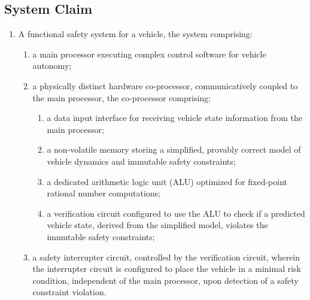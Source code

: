 \documentclass{article}
\begin{document}
\subsection*{System Claim}
\begin{enumerate}
    \item A functional safety system for a vehicle, the system comprising:
    \begin{enumerate}
        \item a main processor executing complex control software for vehicle autonomy;
        \item a physically distinct hardware co-processor, communicatively coupled to the main processor, the co-processor comprising:
        \begin{enumerate}
            \item a data input interface for receiving vehicle state information from the main processor;
            \item a non-volatile memory storing a simplified, provably correct model of vehicle dynamics and immutable safety constraints;
            \item a dedicated arithmetic logic unit (ALU) optimized for fixed-point rational number computations;
            \item a verification circuit configured to use the ALU to check if a predicted vehicle state, derived from the simplified model, violates the immutable safety constraints;
        \end{enumerate}
        \item a safety interrupter circuit, controlled by the verification circuit, wherein the interrupter circuit is configured to place the vehicle in a minimal risk condition, independent of the main processor, upon detection of a safety constraint violation.
    \end{enumerate}
\end{enumerate}
\end{document}
